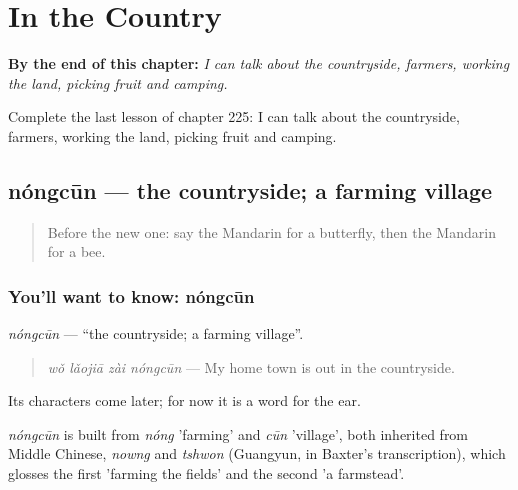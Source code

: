 
\chapter{In the Country}
\label{ch:zh-in-the-country}

\begin{chapteropening}
\textbf{By the end of this chapter:} \emph{I can talk about the countryside, farmers, working the land, picking fruit and camping.}

Complete the last lesson of chapter 225: I can talk about the countryside, farmers, working the land, picking fruit and camping.
\end{chapteropening}

\section[nóngcūn]{nóngcūn — the countryside; a farming village}

\label{lesson:ZH-C225-nongcun}



\begin{quote}
Before the new one: say the Mandarin for a butterfly, then the Mandarin for a bee.
\end{quote}

\subsection*{You'll want to know: nóngcūn}
\emph{nóngcūn} — \textquotedblleft{}the countryside; a farming village\textquotedblright{}.

\begin{quote}
\emph{wǒ lǎojiā zài nóngcūn} — My home town is out in the countryside.
\end{quote}

Its characters come later; for now it is a word for the ear.

\begin{cousinweb}
\emph{nóngcūn} is built from \emph{nóng} 'farming' and \emph{cūn} 'village', both inherited from Middle Chinese, \emph{nowng} and \emph{tshwon} (Guangyun, in Baxter's transcription), which glosses the first 'farming the fields' and the second 'a farmstead'.
\end{cousinweb}

